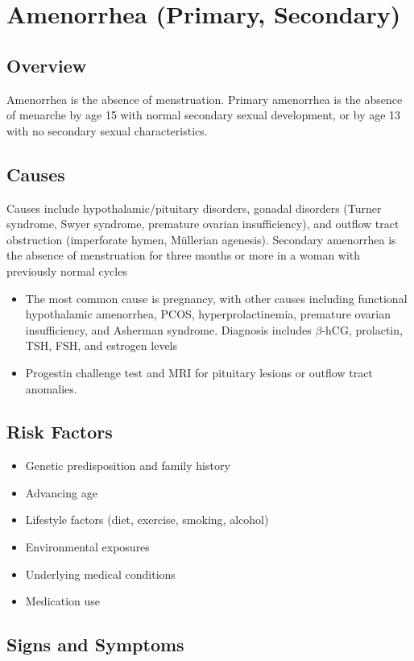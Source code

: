 \chapter{Amenorrhea (Primary, Secondary)}
\label{sec:Amenorrhea}

\section{Overview}
Amenorrhea is the absence of menstruation. Primary amenorrhea is the absence of menarche by age 15 with normal secondary sexual development, or by age 13 with no secondary sexual characteristics.
\section{Causes}
Causes include hypothalamic/pituitary disorders, gonadal disorders (Turner syndrome, Swyer syndrome, premature ovarian insufficiency), and outflow tract obstruction (imperforate hymen, M\"ullerian agenesis). Secondary amenorrhea is the absence of menstruation for three months or more in a woman with previously normal cycles

\begin{itemize}[noitemsep]
  \item The most common cause is pregnancy, with other causes including functional hypothalamic amenorrhea, PCOS, hyperprolactinemia, premature ovarian insufficiency, and Asherman syndrome. Diagnosis includes $\beta$-hCG, prolactin, TSH, FSH, and estrogen levels
  \item Progestin challenge test and MRI for pituitary lesions or outflow tract anomalies.
\end{itemize}
\section{Risk Factors}


\begin{itemize}[noitemsep]
  \item Genetic predisposition and family history
  \item Advancing age
  \item Lifestyle factors (diet, exercise, smoking, alcohol)
  \item Environmental exposures
  \item Underlying medical conditions
  \item Medication use
\end{itemize}
\section{Signs and Symptoms}

